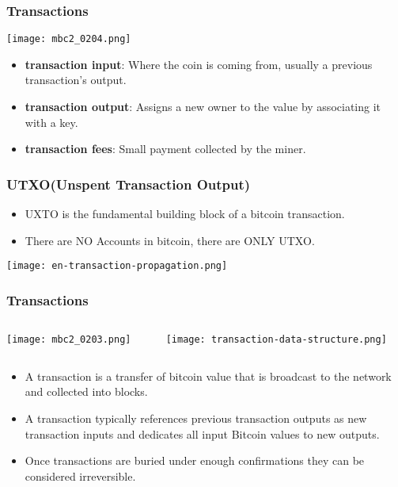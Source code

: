 \begin{frame}
    \frametitle{Transactions}
    \texttt{[image: mbc2\_0204.png]}
    \begin{itemize}
        \item \textbf{transaction input}: Where the coin is coming from, usually a previous transaction's output.
        \item \textbf{transaction output}: Assigns a new owner to the value by associating it with a key.
        \item \textbf{transaction fees}: Small payment collected by the miner.
    \end{itemize}
\end{frame}

\begin{frame}
    \frametitle{UTXO(Unspent Transaction Output)}
    \begin{itemize}
        \item UXTO is the fundamental building block of a bitcoin transaction.
        \item There are \alert{NO Accounts} in bitcoin, there are \alert{ONLY UTXO}.
    \end{itemize}
    \texttt{[image: en-transaction-propagation.png]}
\end{frame}

\begin{frame}
    \frametitle{Transactions}
    \begin{columns}
        \begin{column}{0.5\textwidth}
            \texttt{[image: mbc2\_0203.png]}
        \end{column}
        \begin{column}{0.5\textwidth}
            \texttt{[image: transaction-data-structure.png]}
        \end{column}
    \end{columns}
    \begin{itemize}
        \item A transaction is a transfer of bitcoin value that is broadcast to the network and collected into blocks.
        \item A transaction typically references previous transaction outputs as new transaction inputs and dedicates all input Bitcoin values to new outputs.
        \item Once transactions are buried under enough \alert{confirmations} they can be considered \alert{irreversible}.
    \end{itemize}
\end{frame}

